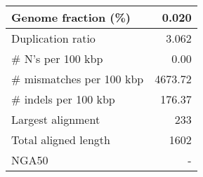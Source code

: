 \documentclass[12pt,a4paper]{article}
\begin{document}
\begin{table}[ht]
\begin{center}
\begin{tabular}{|l*{1}{|r}|}
Genome fraction (\%) & 0.020 \\ \hline
Duplication ratio & 3.062 \\ \hline
\# N's per 100 kbp & 0.00 \\ \hline
\# mismatches per 100 kbp & 4673.72 \\ \hline
\# indels per 100 kbp & 176.37 \\ \hline
Largest alignment & 233 \\ \hline
Total aligned length & 1602 \\ \hline
NGA50 & - \\ \hline
\end{tabular}
\end{center}
\end{table}
\end{document}
